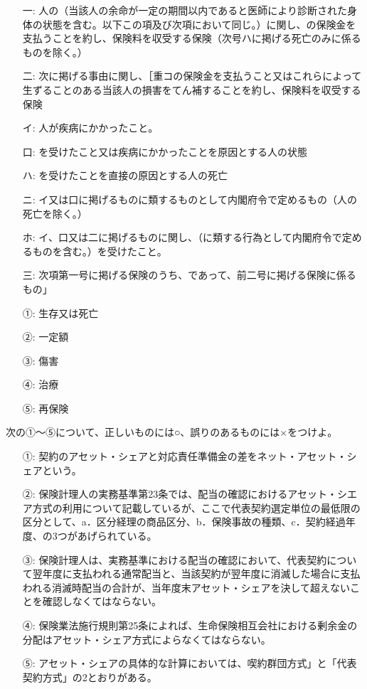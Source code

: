 \documentclass[report,gutter=10mm,fore-edge=10mm,uplatex,dvipdfmx]{jlreq}
\begin{document}
\begin{itemize}
\item[一: ] 人の（当該人の余命が一定の期間以内であると医師により診断された身体の状態を含む。以下この項及び次項において同じ。）に関し、の保険金を支払うことを約し、保険料を収受する保険（次号ハに掲げる死亡のみに係るものを除く。）
\item[二: ] 次に掲げる事由に関し、［重コの保険金を支払うこと又はこれらによって生ずることのある当該人の損害をてん補することを約し、保険料を収受する保険
\item[イ: ] 人が疾病にかかったこと。
\item[口: ] を受けたこと又は疾病にかかったことを原因とする人の状態
\item[ハ: ] を受けたことを直接の原因とする人の死亡
\item[ニ: ] イ又は口に掲げるものに類するものとして内閣府令で定めるもの（人の死亡を除く。）
\item[ホ: ] イ、口又は二に掲げるものに関し、（に類する行為として内閣府令で定めるものを含む。）を受けたこと。
\item[三: ] 次項第一号に掲げる保険のうち、であって、前二号に掲げる保険に係るもの」
\end{itemize}

\answer{}
\begin{itemize}
\item[ ①: ] 生存又は死亡
\item[ ②: ] 一定額
\item[ ③: ] 傷害
\item[ ④: ] 治療
\item[ ⑤: ] 再保険
\end{itemize}

次の①〜⑤について、正しいものには○、誤りのあるものには×をつけよ。

\begin{itemize}
\item[ ①: ] 契約のアセット・シェアと対応責任準備金の差をネット・アセット・シェアという。
\item[ ②: ] 保険計理人の実務基準第23条では、配当の確認におけるアセット・シエア方式の利用について記載しているが、ここで代表契約選定単位の最低限の区分として、a．区分経理の商品区分、b．保険事故の種類、c．契約経過年度、の3つがあげられている。
\item[ ③: ] 保険計理人は、実務基準における配当の確認において、代表契約について翌年度に支払われる通常配当と、当該契約が翌年度に消滅した場合に支払われる消滅時配当の合計が、当年度末アセット・シェアを決して超えないことを確認しなくてはならない。
\item[ ④: ] 保険業法施行規則第25条によれば、生命保険相互会社における剰余金の分配はアセット・シェア方式によらなくてはならない。
\item[ ⑤: ] アセット・シェアの具体的な計算においては、喫約群団方式」と「代表契約方式」の2とおりがある。
\end{itemize}
\end{document}
